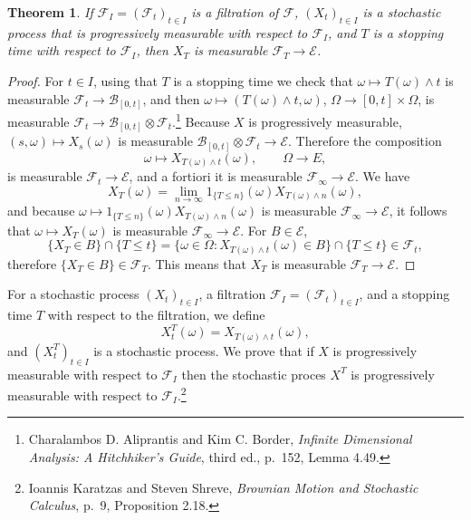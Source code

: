 \documentclass{article}
\newtheorem{theorem}{Theorem}
\theoremstyle{definition}
\begin{document}
\begin{theorem}
If $\mathscr{F}_I  =(\mathscr{F}_t)_{t \in I}$ is a filtration of $\mathscr{F}$,
$(X_t)_{t \in I}$ is a stochastic process that is progressively measurable with respect to $\mathscr{F}_I$,
and $T$ is a stopping time with respect to $\mathscr{F}_I$, then $X_T$ is measurable $\mathscr{F}_T \to \mathscr{E}$.
\label{XT}
\end{theorem}
\begin{proof}
For $t \in I$, using that $T$ is a stopping time we check that $\omega \mapsto T(\omega) \wedge t$ is measurable $\mathscr{F}_t
\to \mathscr{B}_{[0,t]}$, and then $\omega \mapsto (T(\omega) \wedge t,\omega)$,
$\Omega \to [0,t] \times \Omega$,
 is measurable $\mathscr{F}_t \to \mathscr{B}_{[0,t]} \otimes \mathscr{F}_t$.\footnote{Charalambos D. Aliprantis and Kim C. Border, {\em Infinite Dimensional Analysis:
A Hitchhiker's Guide}, third ed., p.~152, Lemma 4.49.}
Because $X$ is progressively
 measurable, $(s,\omega) \mapsto X_s(\omega)$ is measurable
 $\mathscr{B}_{[0,t]} \otimes \mathscr{F}_t \to \mathscr{E}$. Therefore the composition
 \[
 \omega \mapsto X_{T(\omega) \wedge t}(\omega), \qquad \Omega \to E,
 \]
 is measurable $\mathscr{F}_t \to \mathscr{E}$, and a fortiori it is measurable
 $\mathscr{F}_\infty \to \mathscr{E}$.
 We have
 \[
 X_T(\omega) = \lim_{n \to \infty} 1_{\{T \leq n\}}(\omega) X_{T(\omega) \wedge n}(\omega),
 \]
 and because 
 $\omega \mapsto 1_{\{T \leq n\}}(\omega) X_{T(\omega) \wedge n}(\omega)$ is measurable
 $\mathscr{F}_\infty \to \mathscr{E}$, 
 it follows that $\omega \mapsto  X_T(\omega)$  is measurable $\mathscr{F}_\infty \to \mathscr{E}$.
 For $B \in \mathscr{E}$,
 \[
\{X_T \in B\} \cap \{T \leq t\} = \{\omega \in \Omega: X_{T(\omega) \wedge t}(\omega) \in B\} \cap \{T \leq t\} \in \mathscr{F}_t,
 \]
therefore $\{X_T \in B\} \in \mathscr{F}_T$. This means that
$X_T$ is measurable $\mathscr{F}_T \to \mathscr{E}$.
\end{proof}


For a stochastic process $(X_t)_{t \in I}$, a filtration $\mathscr{F}_I =(\mathscr{F}_t)_{t \in I}$, and a stopping time
$T$ with respect to the filtration, we define 
\[
X^T_t(\omega) = X_{T(\omega) \wedge t}(\omega),
\]
and $(X^T_t)_{t \in I}$ is a stochastic process.
We prove that if $X$ is progressively measurable with respect to  $\mathscr{F}_I$ then
the stochastic proces $X^T$ is progressively measurable with respect to $\mathscr{F}_I$.\footnote{Ioannis Karatzas and Steven Shreve,
{\em Brownian Motion and Stochastic Calculus}, 
p.~9, Proposition 2.18.}
\end{document}
